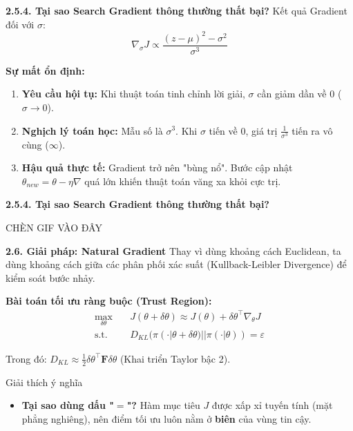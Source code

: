 \documentclass[10pt,xcolor=dvipsnames]{beamer}
\begin{document}
\begin{frame}{\textbf{2.5.4. Tại sao Search Gradient thông thường thất bại?}}
	Kết quả Gradient đối với $\sigma$:
	\[ \nabla_\sigma J \propto \frac{(z - \mu)^2 - \sigma^2}{\sigma^3} \]
	
	\textbf{Sự mất ổn định:}
	\begin{enumerate}
		\item \textbf{Yêu cầu hội tụ:} Khi thuật toán tinh chỉnh lời giải, $\sigma$ cần giảm dần về 0 ($\sigma \to 0$).
		\item \textbf{Nghịch lý toán học:} Mẫu số là $\sigma^3$. Khi $\sigma$ tiến về 0, giá trị $\frac{1}{\sigma^3}$ tiến ra vô cùng ($\infty$).
		\item \textbf{Hậu quả thực tế:} Gradient trở nên "bùng nổ". Bước cập nhật $\theta_{new} = \theta - \eta \nabla$ quá lớn khiến thuật toán văng xa khỏi cực trị.
	\end{enumerate}
\end{frame}

\begin{frame}{\textbf{2.5.4. Tại sao Search Gradient thông thường thất bại?}}
	\begin{center}
		CHÈN GIF VÀO ĐÂY
	\end{center}
\end{frame}

\begin{frame}{\textbf{2.6. Giải pháp: Natural Gradient}}
	Thay vì dùng khoảng cách Euclidean, ta dùng khoảng cách giữa các phân phối xác suất (Kullback-Leibler Divergence) để kiểm soát bước nhảy.
	
	\textbf{Bài toán tối ưu ràng buộc (Trust Region):}
	\begin{align}
		\max_{\delta \theta} \quad & J(\theta + \delta \theta) \approx J(\theta) + \delta \theta^\top \nabla_\theta J \nonumber \\
		\text{s.t.} \quad & D_{KL}(\pi(\cdot|\theta + \delta \theta) || \pi(\cdot|\theta)) = \varepsilon
	\end{align}
	
	Trong đó: $D_{KL} \approx \frac{1}{2} \delta \theta^\top \mathbf{F} \delta \theta$ (Khai triển Taylor bậc 2).
	
	\vspace{0.5em}
	\begin{block}{Giải thích ý nghĩa}
		\begin{itemize}
			\item \textbf{Tại sao dùng dấu "$=$"?} Hàm mục tiêu $J$ được xấp xỉ tuyến tính (mặt phẳng nghiêng), nên điểm tối ưu luôn nằm ở \textbf{biên} của vùng tin cậy.
		\end{itemize}
	\end{block}
\end{frame}
\end{document}
